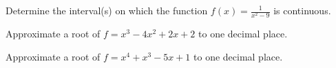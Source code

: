 \begin{exercises}
\begin{exercise}
Determine the interval(s) on which the function $f(x) = \frac{1}{x^2
  -9}$ is continuous.
\end{exercise}


\begin{exercise}
Approximate a root of $f=x^3-4x^2+2x+2$ to one decimal place.
\end{exercise}

\begin{exercise}
Approximate a root of $f=x^4+x^3-5x+1$ to one decimal place.
\end{exercise}
\end{exercises}
